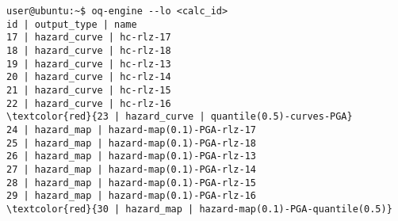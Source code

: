 \begin{Verbatim}[frame=single, commandchars=\\\{\}, fontsize=\small]
user@ubuntu:~$ oq-engine --lo <calc_id>
id | output_type | name
17 | hazard_curve | hc-rlz-17
18 | hazard_curve | hc-rlz-18
19 | hazard_curve | hc-rlz-13
20 | hazard_curve | hc-rlz-14
21 | hazard_curve | hc-rlz-15
22 | hazard_curve | hc-rlz-16
\textcolor{red}{23 | hazard_curve | quantile(0.5)-curves-PGA}
24 | hazard_map | hazard-map(0.1)-PGA-rlz-17
25 | hazard_map | hazard-map(0.1)-PGA-rlz-18
26 | hazard_map | hazard-map(0.1)-PGA-rlz-13
27 | hazard_map | hazard-map(0.1)-PGA-rlz-14
28 | hazard_map | hazard-map(0.1)-PGA-rlz-15
29 | hazard_map | hazard-map(0.1)-PGA-rlz-16
\textcolor{red}{30 | hazard_map | hazard-map(0.1)-PGA-quantile(0.5)}
\end{Verbatim}